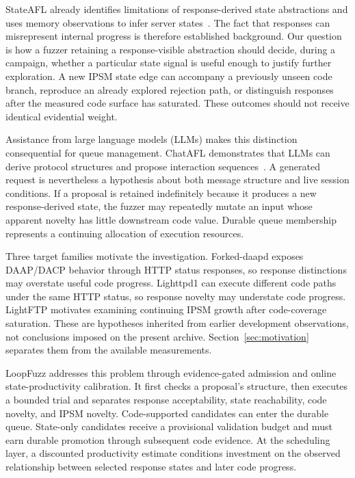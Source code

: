 \documentclass[final,5p,times,number]{elsarticle}
\begin{document}
StateAFL already identifies limitations of response-derived state abstractions and uses memory observations to infer server states~\cite{stateafl}. The fact that responses can misrepresent internal progress is therefore established background. Our question is how a fuzzer retaining a response-visible abstraction should decide, during a campaign, whether a particular state signal is useful enough to justify further exploration. A new IPSM state edge can accompany a previously unseen code branch, reproduce an already explored rejection path, or distinguish responses after the measured code surface has saturated. These outcomes should not receive identical evidential weight.

Assistance from large language models (LLMs) makes this distinction consequential for queue management. ChatAFL demonstrates that LLMs can derive protocol structures and propose interaction sequences~\cite{chatafl}. A generated request is nevertheless a hypothesis about both message structure and live session conditions. If a proposal is retained indefinitely because it produces a new response-derived state, the fuzzer may repeatedly mutate an input whose apparent novelty has little downstream code value. Durable queue membership represents a continuing allocation of execution resources.

Three target families motivate the investigation. Forked-daapd exposes DAAP/DACP behavior through HTTP status responses, so response distinctions may overstate useful code progress. Lighttpd1 can execute different code paths under the same HTTP status, so response novelty may understate code progress. LightFTP motivates examining continuing IPSM growth after code-coverage saturation. These are hypotheses inherited from earlier development observations, not conclusions imposed on the present archive. Section~\ref{sec:motivation} separates them from the available measurements.

LoopFuzz addresses this problem through evidence-gated admission and online state-productivity calibration. It first checks a proposal's structure, then executes a bounded trial and separates response acceptability, state reachability, code novelty, and IPSM novelty. Code-supported candidates can enter the durable queue. State-only candidates receive a provisional validation budget and must earn durable promotion through subsequent code evidence. At the scheduling layer, a discounted productivity estimate conditions investment on the observed relationship between selected response states and later code progress.
\end{document}
